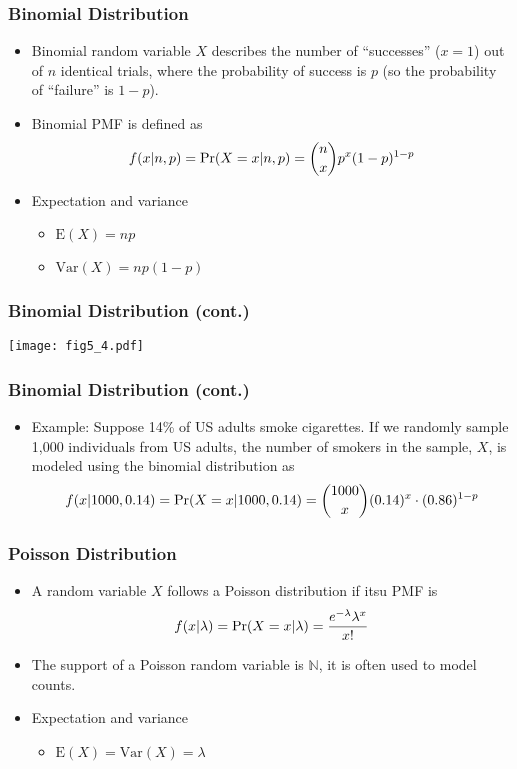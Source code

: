 \documentclass[pdflatex, 12pt]{beamer}
\newcommand{\N}{\mathbb{N}}
\begin{document}
\begin{frame}
\frametitle{Binomial Distribution}
\begin{itemize}
\item Binomial random variable $X$ describes the number of ``successes'' ($x = 1$) out of $n$ identical trials, where the probability of success is $p$ (so the probability of ``failure'' is $1 - p$).
\vspace{0.4cm}
\item Binomial PMF is defined as
 \begin{equation}
 f(x|n, p) = \Pr(X = x|n, p) = \binom{n}{x} p^x (1 - p)^{1 - p} \notag
 \end{equation}
\vspace{0.4cm}
\item Expectation and variance
 \begin{itemize}
 \item $\mathrm{E}(X) = np$
 \item $\mathrm{Var}(X) = np(1 - p)$
 \end{itemize}
\end{itemize}
\end{frame}

\begin{frame}
\frametitle{Binomial Distribution (cont.)}
\centering
\texttt{[image: fig5\_4.pdf]}
\end{frame}

\begin{frame}
\frametitle{Binomial Distribution (cont.)}
\begin{itemize}
\item Example: Suppose 14\% of US adults smoke cigarettes. If we randomly sample 1,000 individuals from US adults, the number of smokers in the sample, $X$, is modeled using the binomial distribution as
 {\small
 \begin{equation}
 f(x|1000, 0.14) = \Pr(X = x|1000, 0.14) = \binom{1000}{x} (0.14)^x \cdot (0.86)^{1 - p} \notag
 \end{equation}
 }
\end{itemize}
\end{frame}

\begin{frame}
\frametitle{Poisson Distribution}
\begin{itemize}
\item A random variable $X$ follows a Poisson distribution if itsu PMF is
 \begin{equation}
 f(x|\lambda) = \Pr(X = x|\lambda) = \frac{e^{-\lambda}\lambda^x}{x!} \notag
 \end{equation}
\vspace{0.2cm}
\item The support of a Poisson random variable is $\N$, it is often used to model counts.
\vspace{0.4cm}
\item Expectation and variance
 \begin{itemize}
 \item $\mathrm{E}(X) = \mathrm{Var}(X) = \lambda$
 \end{itemize}
\end{itemize}
\end{frame}
\end{document}
